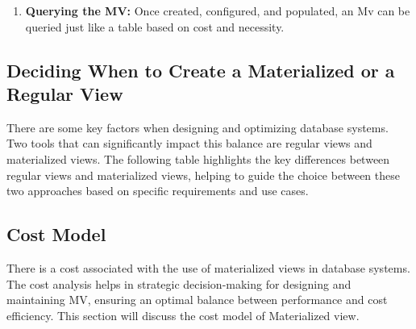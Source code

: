 \begin{enumerate}
      \item\textbf{ Querying the MV:} Once created, configured, and populated, an Mv can be queried just like a table based on cost and necessity.  \vspace{0.4cm}
      

\end{enumerate}

\subsection{Deciding When to Create a Materialized or a Regular View}There are some key factors when designing and optimizing database systems. Two tools that can significantly impact this balance are regular views and materialized views. The following table highlights the key differences between regular views and materialized views, helping to guide the choice between these two approaches based on specific requirements and use cases.\vspace{.4cm}




 \subsection{Cost Model}
 There is a cost associated with the use of materialized views in database systems. The cost analysis helps in strategic decision-making for designing and maintaining MV, ensuring an optimal balance between performance and cost efficiency. This section will discuss the cost model of Materialized view.\vspace{.4cm}

